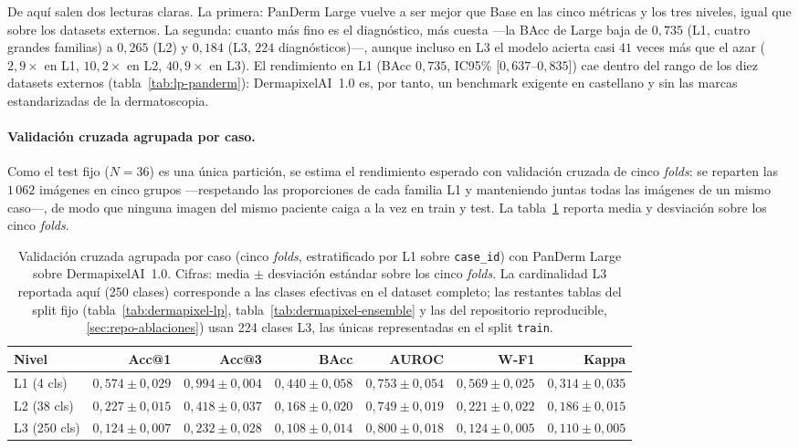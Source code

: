 De aquí salen dos lecturas claras. La primera: PanDerm Large vuelve a
ser mejor que Base en las cinco métricas y los tres niveles, igual que
sobre los datasets externos. La segunda: cuanto más fino es el
diagnóstico, más cuesta ---la BAcc de Large baja de $0{,}735$ (L1,
cuatro grandes familias) a $0{,}265$ (L2) y $0{,}184$ (L3, $224$
diagnósticos)---, aunque incluso en L3 el modelo acierta casi $41$
veces más que el azar ($2{,}9\times$ en L1, $10{,}2\times$ en L2,
$40{,}9\times$ en L3). El rendimiento en L1 (BAcc $0{,}735$, IC95\%
[$0{,}637$--$0{,}835$]) cae dentro del rango de los diez datasets
externos (tabla~\ref{tab:lp-panderm}): DermapixelAI~1.0 es, por tanto,
un benchmark exigente en castellano y sin las marcas
estandarizadas de la dermatoscopia.


\paragraph{Validación cruzada agrupada por caso.}
Como el test fijo ($N = 36$) es una única partición, se estima el
rendimiento esperado con validación cruzada de cinco \emph{folds}: se
reparten las $1\,062$ imágenes en cinco grupos ---respetando las
proporciones de cada familia L1 y manteniendo juntas todas las imágenes
de un mismo caso---, de modo que ninguna imagen del mismo paciente caiga
a la vez en train y test. La tabla~\ref{tab:dermapixel-cv} reporta media
y desviación sobre los cinco \emph{folds}.

\begin{table}[htbp]
\centering
\footnotesize
\setlength{\tabcolsep}{4pt}
\renewcommand{\arraystretch}{0.95}
\caption{Validación cruzada agrupada por caso (cinco \emph{folds},
estratificado por L1 sobre \texttt{case\_id}) con PanDerm Large
sobre DermapixelAI~1.0. Cifras: media $\pm$ desviación estándar
sobre los cinco \emph{folds}. La cardinalidad L3 reportada aquí
(250 clases) corresponde a las clases efectivas en el dataset
completo; las restantes tablas del split fijo
(tabla~\ref{tab:dermapixel-lp}, tabla~\ref{tab:dermapixel-ensemble}
y las del repositorio reproducible, \ref{sec:repo-ablaciones}) usan 224 clases L3, las
únicas representadas en el split \texttt{train}.}
\label{tab:dermapixel-cv}
\begin{tabular}{lrrrrrr}
\hline
Nivel           & Acc@1                 & Acc@3                 & BAcc                  & AUROC                 & W-F1                  & Kappa \\
\hline
L1 (4 cls)      & $0{,}574 \pm 0{,}029$ & $0{,}994 \pm 0{,}004$ & $0{,}440 \pm 0{,}058$ & $0{,}753 \pm 0{,}054$ & $0{,}569 \pm 0{,}025$ & $0{,}314 \pm 0{,}035$ \\
L2 (38 cls)     & $0{,}227 \pm 0{,}015$ & $0{,}418 \pm 0{,}037$ & $0{,}168 \pm 0{,}020$ & $0{,}749 \pm 0{,}019$ & $0{,}221 \pm 0{,}022$ & $0{,}186 \pm 0{,}015$ \\
L3 (250 cls)    & $0{,}124 \pm 0{,}007$ & $0{,}232 \pm 0{,}028$ & $0{,}108 \pm 0{,}014$ & $0{,}800 \pm 0{,}018$ & $0{,}124 \pm 0{,}005$ & $0{,}110 \pm 0{,}005$ \\
\hline
\end{tabular}
\end{table}

